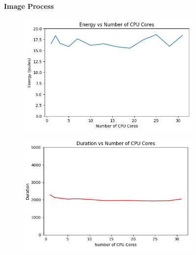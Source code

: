 \documentclass[times, 10pt,twocolumn]{article}
\begin{document}
\begin{figure}[ht]
   \textbf{Image Process}\par\medskip
   \begin{subfigure}[b]{0.3\textwidth}
      \includegraphics[width=\textwidth]{imgs/study_1_results/var_cpu/imageprocess/CPU_Energy.png}
     \caption{}
     \label{fig:plot4}
   \end{subfigure}
   \hfill
   \begin{subfigure}[b]{0.3\textwidth}
      \includegraphics[width=\textwidth]{imgs/study_1_results/var_cpu/imageprocess/CPU_Duration.png}
     \caption{}
     \label{fig:plot5}
   \end{subfigure}
   \hfill
   \begin{subfigure}[b]{0.3\textwidth}

\end{subfigure}
\end{figure}
\end{document}
